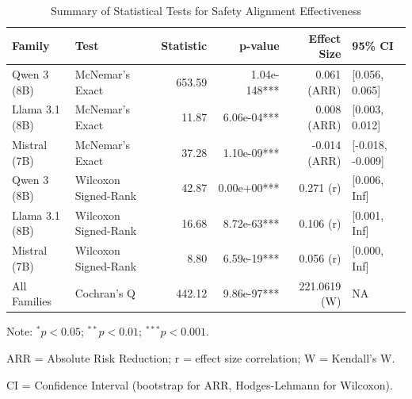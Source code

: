\begin{table}[htbp]
\centering
\caption{Summary of Statistical Tests for Safety Alignment Effectiveness}
\label{tab:summary}
\begin{tabular}{llrrrl}
\toprule
Family & Test & Statistic & p-value & Effect Size & 95\% CI \\
\midrule
Qwen 3 (8B) & McNemar's Exact & 653.59 & 1.04e-148*** & 0.061 (ARR) & [0.056, 0.065] \\
Llama 3.1 (8B) & McNemar's Exact & 11.87 & 6.06e-04*** & 0.008 (ARR) & [0.003, 0.012] \\
Mistral (7B) & McNemar's Exact & 37.28 & 1.10e-09*** & -0.014 (ARR) & [-0.018, -0.009] \\
\midrule
Qwen 3 (8B) & Wilcoxon Signed-Rank & 42.87 & 0.00e+00*** & 0.271 (r) & [0.006, Inf] \\
Llama 3.1 (8B) & Wilcoxon Signed-Rank & 16.68 & 8.72e-63*** & 0.106 (r) & [0.001, Inf] \\
Mistral (7B) & Wilcoxon Signed-Rank & 8.80 & 6.59e-19*** & 0.056 (r) & [0.000, Inf] \\
\midrule
All Families & Cochran's Q & 442.12 & 9.86e-97*** & 221.0619 (W) & NA \\
\bottomrule
\end{tabular}
\begin{tablenotes}
\small
\item Note: $^{*}p<0.05$; $^{**}p<0.01$; $^{***}p<0.001$.
\item ARR = Absolute Risk Reduction; r = effect size correlation; W = Kendall's W.
\item CI = Confidence Interval (bootstrap for ARR, Hodges-Lehmann for Wilcoxon).
\end{tablenotes}
\end{table}
